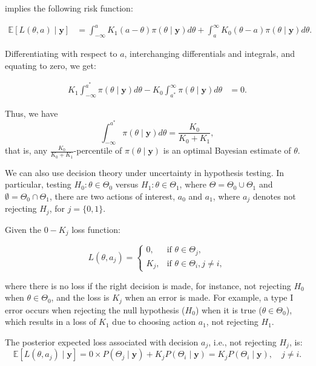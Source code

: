 \begin{itemize}
	implies the following risk function:
	
	\begin{align*}
		\mathbb{E}[L(\theta, a)\mid \mathbf{y}] &= \int_{-\infty}^a K_1(a-\theta)\pi(\theta\mid \mathbf{y})d\theta + \int_a^{\infty} K_0(\theta-a)\pi(\theta\mid \mathbf{y})d\theta. 
	\end{align*}
	
	Differentiating with respect to $a$, interchanging differentials and integrals, and equating to zero, we get:
	
	\begin{align*}
		K_1\int_{-\infty}^{a^*} \pi(\theta\mid \mathbf{y})d\theta - K_0\int_{a^*}^{\infty} \pi(\theta\mid \mathbf{y})d\theta &= 0.
	\end{align*}
	
	Thus, we have
	\[
	\int_{-\infty}^{a^*} \pi(\theta\mid \mathbf{y})d\theta = \frac{K_0}{K_0 + K_1},
	\]
	that is, any $\frac{K_0}{K_0 + K_1}$-percentile of $\pi(\theta\mid \mathbf{y})$ is an optimal Bayesian estimate of $\theta$.
\end{itemize}

We can also use decision theory under uncertainty in hypothesis testing. In particular, testing $H_0:\theta\in\Theta_0$ versus $H_1:\theta\in\Theta_1$, where $\Theta=\Theta_0 \cup \Theta_1$ and $\emptyset=\Theta_0 \cap \Theta_1$, there are two actions of interest, $a_0$ and $a_1$, where $a_j$ denotes not rejecting $H_j$, for $j=\{0,1\}$.

Given the $0-K_j$ loss function:

\begin{equation*}
	L(\theta,a_j)=\begin{cases} 
		0, & \text{if } \theta \in \Theta_j, \\
		K_j, & \text{if } \theta \in \Theta_i, j \neq i,
	\end{cases}
\end{equation*}

where there is no loss if the right decision is made, for instance, not rejecting $H_0$ when $\theta \in \Theta_0$, and the loss is $K_j$ when an error is made. For example, a type I error occurs when rejecting the null hypothesis ($H_0$) when it is true ($\theta \in \Theta_0$), which results in a loss of $K_1$ due to choosing action $a_1$, not rejecting $H_1$.

The posterior expected loss associated with decision $a_j$, i.e., not rejecting $H_j$, is:
\[
\mathbb{E}[L(\theta,a_j) \mid \mathbf{y}] = 0 \times P(\Theta_j \mid \mathbf{y}) + K_j P(\Theta_i \mid \mathbf{y}) = K_j P(\Theta_i \mid \mathbf{y}), \quad j \neq i.
\]

